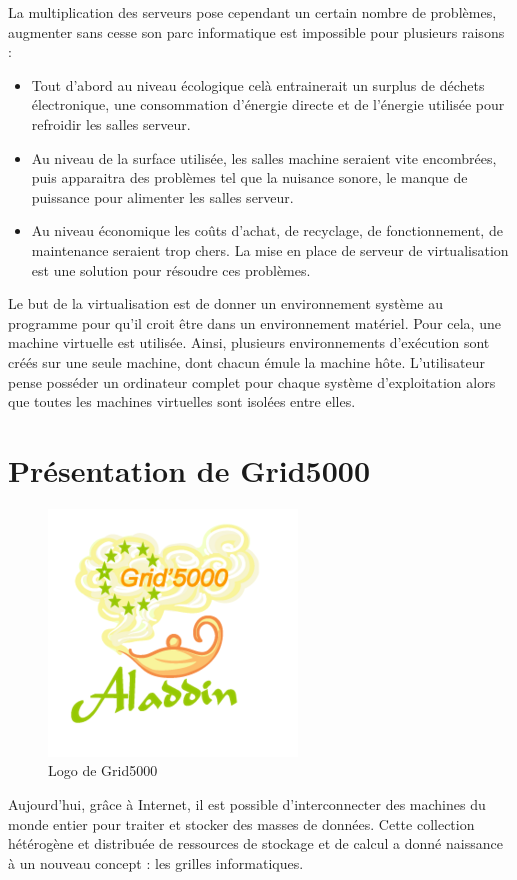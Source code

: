 La multiplication des serveurs pose cependant un certain nombre
de problèmes, augmenter sans cesse son parc informatique est impossible
pour plusieurs raisons : 
\begin{itemize}
\item Tout d'abord au niveau écologique celà entrainerait un surplus de déchets électronique, une consommation d'énergie directe et de l'énergie utilisée pour refroidir les salles serveur.
\item Au niveau de la surface utilisée, les salles machine seraient vite encombrées, puis apparaitra des problèmes tel que la nuisance sonore, le manque de puissance pour alimenter les salles serveur. 
\item Au niveau économique les coûts d'achat, de recyclage, de fonctionnement, de maintenance seraient trop chers. La mise en place de serveur de virtualisation est une solution pour résoudre ces problèmes.
\end{itemize}

Le but de la virtualisation est de donner un environnement système
au programme pour qu'il croit être dans un environnement
matériel. Pour cela, une machine virtuelle est utilisée. Ainsi, plusieurs
environnements d'exécution sont créés sur une seule
machine, dont chacun émule la machine hôte. L'utilisateur
pense posséder un ordinateur complet pour chaque système d'exploitation
alors que toutes les machines virtuelles sont isolées entre elles.


\newpage

\section{Présentation de Grid5000}
\begin{figure}
\begin{center}
\includegraphics{images/logo.png}
\caption{Logo de Grid5000}
\end{center}

\end{figure}
Aujourd’hui, grâce à Internet, il est possible
d’interconnecter des machines du monde entier pour
traiter et stocker des masses de données. Cette collection
hétérogène et distribuée de ressources de stockage et de
calcul a donné naissance à un nouveau concept : les
grilles informatiques.


